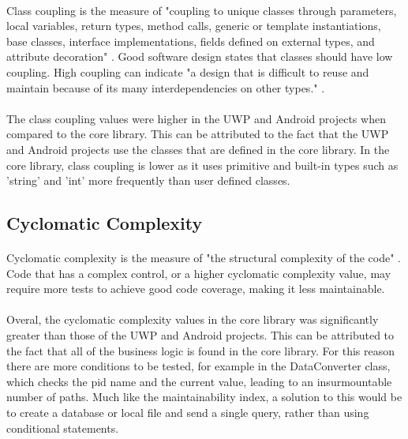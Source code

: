 {		\paragraph{}{
		Class coupling is the measure of "coupling to unique classes through parameters, local variables, return types, method calls, generic or template instantiations, base classes, interface implementations, fields defined on external types, and attribute decoration" \cite{CodeMetrics}. Good software design states that classes should have low coupling. High coupling can indicate "a design that is difficult to reuse and maintain because of its many interdependencies on other types." \cite{CodeMetrics}.
		}
		\paragraph{}{
		The class coupling values were higher in the UWP and Android projects when compared to the core library. This can be attributed to the fact that the UWP and Android projects use the classes that are defined in the core library. In the core library, class coupling is lower as it uses primitive and built-in types such as 'string' and 'int' more frequently than user defined classes.
		}
	
	\subsection*{Cyclomatic Complexity}
		\paragraph{}{
		Cyclomatic complexity is the measure of "the structural complexity of the code" \cite{CodeMetrics}. Code that has a complex control, or a higher cyclomatic complexity value, may require more tests to achieve good code coverage, making it less maintainable.
		}
		\paragraph{}{
		Overal, the cyclomatic complexity values in the core library was significantly greater than those of the UWP and Android projects. This can be attributed to the fact that all of the business logic is found in the core library. For this reason there are more conditions to be tested, for example in the DataConverter class, which checks the pid name and the current value, leading to an insurmountable number of paths. Much like the maintainability index, a solution to this would be to create a database or local file and send a single query, rather than using conditional statements.
		}
	
}
